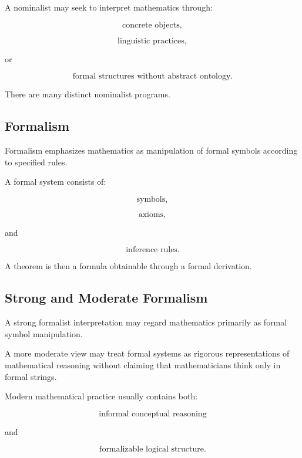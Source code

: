 A nominalist may seek to interpret mathematics through:

\[
\boxed{
\text{concrete objects},
}
\]

\[
\boxed{
\text{linguistic practices},
}
\]

or

\[
\boxed{
\text{formal structures without abstract ontology}.
}
\]

There are many distinct nominalist programs.

\subsection{Formalism}
\label{subsec:mathematical-formalism}

Formalism emphasizes mathematics as manipulation of formal symbols
according to specified rules.

A formal system consists of:

\[
\boxed{
\text{symbols},
}
\]

\[
\boxed{
\text{axioms},
}
\]

and

\[
\boxed{
\text{inference rules}.
}
\]

A theorem is then a formula obtainable through a formal derivation.

\subsection{Strong and Moderate Formalism}
\label{subsec:formalism-varieties}

A strong formalist interpretation may regard mathematics primarily as
formal symbol manipulation.

A more moderate view may treat formal systems as rigorous representations
of mathematical reasoning without claiming that mathematicians think only
in formal strings.

Modern mathematical practice usually contains both:

\[
\boxed{
\text{informal conceptual reasoning}
}
\]

and

\[
\boxed{
\text{formalizable logical structure}.
}
\]

